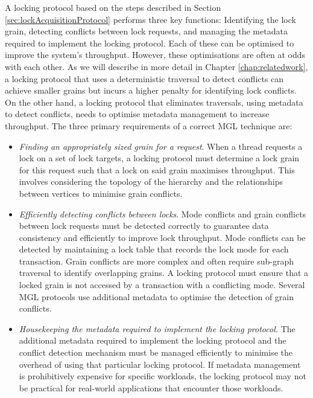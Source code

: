 A locking protocol based on the steps described in Section \ref{sec:lockAcquisitionProtocol} performs three key functions: Identifying the lock grain, detecting conflicts between lock requests, and managing the metadata required to implement the locking protocol. Each of these can be optimised to improve the system's throughput. However, these optimisations are often at odds with each other. As we will describe in more detail in Chapter \ref{chap:relatedwork}, a locking protocol that uses a deterministic traversal to detect conflicts can achieve smaller grains but incurs a higher penalty for identifying lock conflicts. On the other hand, a locking protocol that eliminates traversals, using metadata to detect conflicts, needs to optimise metadata management to increase throughput. The three primary requirements of a correct MGL technique are:

\begin{itemize}

    \item[\Rb] \emph{Finding an appropriately sized grain for a request}. When a thread requests a lock on a set of lock targets, a locking protocol must determine a lock grain for this request such that a lock on said grain maximises throughput. This involves considering the topology of the hierarchy and the relationships between vertices to minimise grain conflicts.
    
    \item[\Rc] \emph{Efficiently detecting conflicts between locks}. Mode conflicts and grain conflicts between lock requests must be detected correctly to guarantee data consistency and efficiently to improve lock throughput. Mode conflicts can be detected by maintaining a lock table that records the lock mode for each transaction. Grain conflicts are more complex and often require sub-graph traversal to identify overlapping grains. A locking protocol must ensure that a locked grain is not accessed by a transaction with a conflicting mode. Several MGL protocols use additional metadata to optimise the detection of grain conflicts.
    
  
    
    \item[\Rd] \emph{Housekeeping the metadata required to implement the locking protocol.} The additional metadata required to implement the locking protocol and the conflict detection mechanism must be managed efficiently to minimise the overhead of using that particular locking protocol. If metadata management is prohibitively expensive for specific workloads, the locking protocol may not be practical for real-world applications that encounter those workloads. 

\end{itemize}


